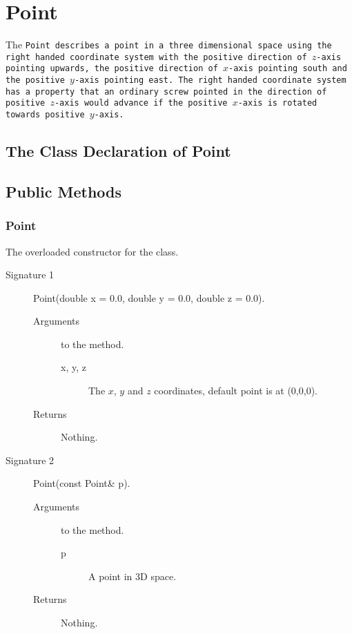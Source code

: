 \section{Point}

The \tt Point \rm describes a point in a three dimensional space using
the  right handed  coordinate system  with the  positive  direction of
$z$-axis pointing upwards, the positive direction of $x$-axis pointing
south  and the  positive  $y$-axis pointing  east.   The right  handed
coordinate system has a property that an ordinary screw pointed in the
direction of positive $z$-axis  would advance if the positive $x$-axis
is rotated towards positive $y$-axis.

\subsection{The Class Declaration of Point}

\subsection{Public Methods}

\subsubsection{Point}
The overloaded constructor for the class. 
\begin{description}
  \item[Signature 1] Point(double x = 0.0, double y = 0.0, double z = 0.0).
  \begin{description}
  \item[Arguments] to the method.
   \begin{description}
      \item[x, y, z] The $x$, $y$ and $z$ coordinates, 
                     default point is at (0,0,0).
   \end{description}
  \item[Returns] Nothing.
  \end{description}
  \item[Signature 2] Point(const Point\& p).
   \begin{description}
  \item[Arguments] to the method.
   \begin{description}
      \item[p] A point in 3D space.
   \end{description}
  \item[Returns] Nothing.
  \end{description}
\end{description}


